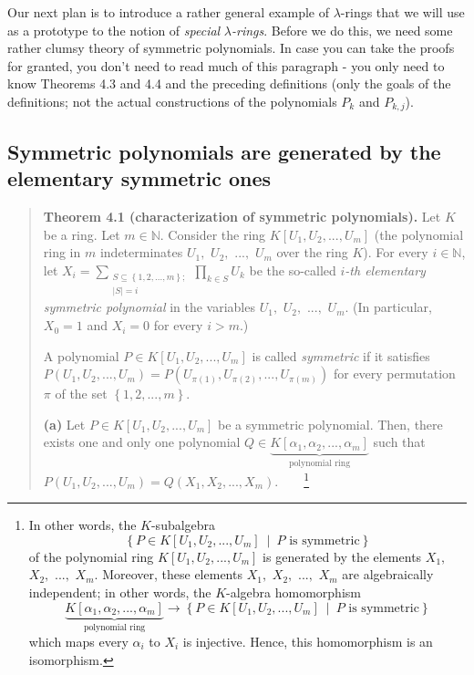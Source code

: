 \documentclass[numbers=enddot,12pt,final,onecolumn,notitlepage]{scrartcl}%
\begin{document}
Our next plan is to introduce a rather general example of $\lambda$-rings that
we will use as a prototype to the notion of \textit{special }$\lambda
$\textit{-rings}. Before we do this, we need some rather clumsy theory of
symmetric polynomials. In case you can take the proofs for granted, you don't
need to read much of this paragraph - you only need to know Theorems 4.3 and
4.4 and the preceding definitions (only the goals of the definitions; not the
actual constructions of the polynomials $P_{k}$ and $P_{k,j}$).

\subsection{Symmetric polynomials are generated by the elementary symmetric
ones}

\begin{quote}
\textbf{Theorem 4.1 (characterization of symmetric polynomials).} Let $K$ be a
ring. Let $m\in\mathbb{N}$. Consider the ring $K\left[  U_{1},U_{2}%
,...,U_{m}\right]  $ (the polynomial ring in $m$ indeterminates $U_{1},$
$U_{2},$ $...,$ $U_{m}$ over the ring $K$). For every $i\in\mathbb{N}$, let
$X_{i}=\sum\limits_{\substack{S\subseteq\left\{  1,2,...,m\right\}
;\\\left\vert S\right\vert =i}}\prod\limits_{k\in S}U_{k}$ be the so-called
$i$\textit{-th elementary symmetric polynomial} in the variables $U_{1},$
$U_{2},$ $...,$ $U_{m}$. (In particular, $X_{0}=1$ and $X_{i}=0$ for every
$i>m$.)

A polynomial $P\in K\left[  U_{1},U_{2},...,U_{m}\right]  $ is called
\textit{symmetric} if it satisfies $P\left(  U_{1},U_{2},...,U_{m}\right)
=P\left(  U_{\pi\left(  1\right)  },U_{\pi\left(  2\right)  },...,U_{\pi
\left(  m\right)  }\right)  $ for every permutation $\pi$ of the set $\left\{
1,2,...,m\right\}  $.

\textbf{(a)} Let $P\in K\left[  U_{1},U_{2},...,U_{m}\right]  $ be a symmetric
polynomial. Then, there exists one and only one polynomial $Q\in
\underbrace{K\left[  \alpha_{1},\alpha_{2},...,\alpha_{m}\right]
}_{\text{polynomial ring}}$ such that $P\left(  U_{1},U_{2},...,U_{m}\right)
=Q\left(  X_{1},X_{2},...,X_{m}\right)  $.\ \ \ \ \footnote{In other words,
the $K$-subalgebra%
\[
\left\{  P\in K\left[  U_{1},U_{2},...,U_{m}\right]  \ \mid\ P\text{ is
symmetric}\right\}
\]
of the polynomial ring $K\left[  U_{1},U_{2},...,U_{m}\right]  $ is generated
by the elements $X_{1},$ $X_{2},$ $...,$ $X_{m}$. Moreover, these elements
$X_{1},$ $X_{2},$ $...,$ $X_{m}$ are algebraically independent; in other
words, the $K$-algebra homomorphism%
\[
\underbrace{K\left[  \alpha_{1},\alpha_{2},...,\alpha_{m}\right]
}_{\text{polynomial ring}}\rightarrow\left\{  P\in K\left[  U_{1}%
,U_{2},...,U_{m}\right]  \ \mid\ P\text{ is symmetric}\right\}
\]
which maps every $\alpha_{i}$ to $X_{i}$ is injective. Hence, this
homomorphism is an isomorphism.}


\end{quote}
\end{document}
